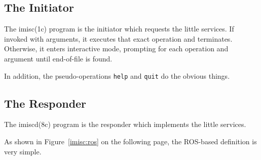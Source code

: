 \subsection	{The Initiator}
The \man imisc(1c) program is the initiator which requests the little
services.
If invoked with arguments,
it executes that exact operation and terminates.
Otherwise, it enters interactive mode,
prompting for each operation and argument until end-of-file is found.

In addition, the pseudo-operations \verb"help" and \verb"quit" do the
obvious things.

\subsection	{The Responder}
The \man imiscd(8c) program is the responder which implements the little
services.

As shown in Figure~\ref{imisc:ros} on the following page,
the ROS-based definition is very simple.
\newpage
{}
